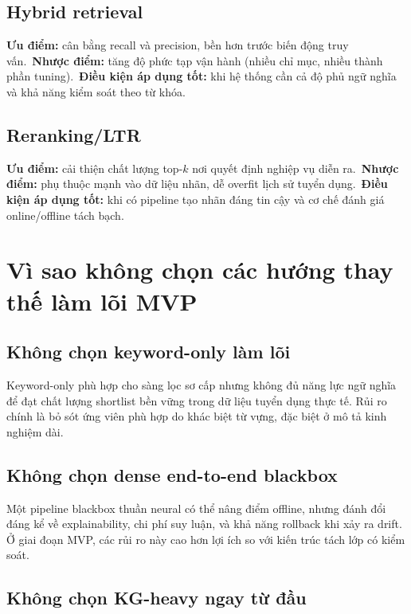 \subsection{Hybrid retrieval}

\textbf{Ưu điểm:} cân bằng recall và precision, bền hơn trước biến động truy vấn.\
\textbf{Nhược điểm:} tăng độ phức tạp vận hành (nhiều chỉ mục, nhiều thành phần tuning).\
\textbf{Điều kiện áp dụng tốt:} khi hệ thống cần cả độ phủ ngữ nghĩa và khả năng kiểm soát theo từ khóa.

\subsection{Reranking/LTR}

\textbf{Ưu điểm:} cải thiện chất lượng top-$k$ nơi quyết định nghiệp vụ diễn ra.\
\textbf{Nhược điểm:} phụ thuộc mạnh vào dữ liệu nhãn, dễ overfit lịch sử tuyển dụng.\
\textbf{Điều kiện áp dụng tốt:} khi có pipeline tạo nhãn đáng tin cậy và cơ chế đánh giá online/offline tách bạch.

\section{Vì sao không chọn các hướng thay thế làm lõi MVP}

\subsection{Không chọn keyword-only làm lõi}

Keyword-only phù hợp cho sàng lọc sơ cấp nhưng không đủ năng lực ngữ nghĩa để đạt chất lượng shortlist bền vững trong dữ liệu tuyển dụng thực tế. Rủi ro chính là bỏ sót ứng viên phù hợp do khác biệt từ vựng, đặc biệt ở mô tả kinh nghiệm dài.

\subsection{Không chọn dense end-to-end blackbox}

Một pipeline blackbox thuần neural có thể nâng điểm offline, nhưng đánh đổi đáng kể về explainability, chi phí suy luận, và khả năng rollback khi xảy ra drift. Ở giai đoạn MVP, các rủi ro này cao hơn lợi ích so với kiến trúc tách lớp có kiểm soát.

\subsection{Không chọn KG-heavy ngay từ đầu}

